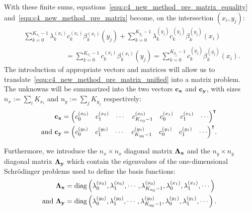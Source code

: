 With these finite sums, equations~\eqref{equ:c4_new_method_pre_matrix_equality} and~\eqref{equ:c4_new_method_pre_matrix} become, on the intersection $(x_i, y_j)$:
\begin{align}
     & \sum_{k=0}^{K_{x_i}-1} \lambda_k^{(x_i)} c_k^{(x_i)} \beta^{(x_i)}_k(y_j) + \sum_{k=0}^{K_{y_j}-1} \lambda_k^{(y_j)} c_k^{(y_j)} \beta_k^{(y_j)}(x_i)\nonumber                                  \\
     & \qquad\qquad\qquad     = \sum_{k=0}^{K_{x_i}-1} c_k^{(x_i)} \beta_k^{(x_i)}(y_j) = \sum_{k=0}^{K_{y_j}-1} c_k^{(y_j)} \beta_k^{(y_j)}(x_i) \text{.}\label{equ:c4_new_method_pre_matrix_unified}
\end{align}
The introduction of appropriate vectors and matrices will allow us to translate~\eqref{equ:c4_new_method_pre_matrix_unified} into a matrix problem. The unknowns will be summarized into the two vectors $\vb{c_x}$ and $\vb{c_y}$, with sizes $n_x := \sum_i K_{x_i}$ and $n_y := \sum_j K_{y_j}$ respectively:
\begin{align*}
    \vb{c_x}            & = {\begin{pmatrix} c_0^{(x_0)} & c_1^{(x_0)} & \cdots & c_{K_{x_0}-1}^{(x_0)} & c_0^{(x_1)} & c_1^{(x_1)} & \cdots \end{pmatrix}}^\intercal         \\
    \text{and }\vb{c_y} & = {\begin{pmatrix} c_0^{(y_0)} & c_1^{(y_0)} & \cdots & c_{K_{y_0}-1}^{(y_0)} & c_0^{(y_1)} & c_1^{(y_1)} & \cdots \end{pmatrix}}^\intercal\text{.}
\end{align*}

Furthermore, we introduce the $n_x \times n_x$ diagonal matrix $\vb{\Lambda_x}$ and the $n_y \times n_y$ diagonal matrix $\vb{\Lambda_y}$ which contain the eigenvalues of the one-dimensional Schrödinger problems used to define the basis functions:
\begin{align*}
    \vb{\Lambda_x}            & = \operatorname{diag}\left( \lambda_0^{(x_0)}, \lambda_1^{(x_0)}, \cdots, \lambda_{K_{x_0}-1}^{(x_0)}, \lambda_0^{(x_1)}, \lambda_1^{(x_1)}, \cdots \right)         \\
    \text{and }\vb{\Lambda_y} & = \operatorname{diag}\left( \lambda_0^{(y_0)}, \lambda_1^{(y_0)}, \cdots, \lambda_{K_{y_0}-1}^{(y_0)}, \lambda_0^{(y_1)}, \lambda_1^{(y_1)}, \cdots \right)\text{.} \\
\end{align*}

